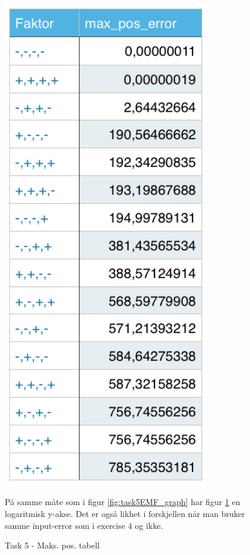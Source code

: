 	\begin{figure}
		\begin{minipage}{.5\textwidth}
			\centering
			\includegraphics[width=0.8\textwidth]{sections/Exercise5/max_pos_error.png}
		    	\caption{Task 5 - Maks. pos. tabell}
		    	\label{fig:task5max_pos_error}
		\end{minipage}
		\vspace{20 mm}
		\begin{minipage}{.5\textwidth}
			På samme måte som i figur \ref{fig:task5EMF_graph} har figur \ref{fig:task5max_pos_error} en logaritmisk y-akse. Det er også likhet i forskjellen når man bruker samme input-error som i exercise 4 og ikke.
		\end{minipage}


\end{figure}
